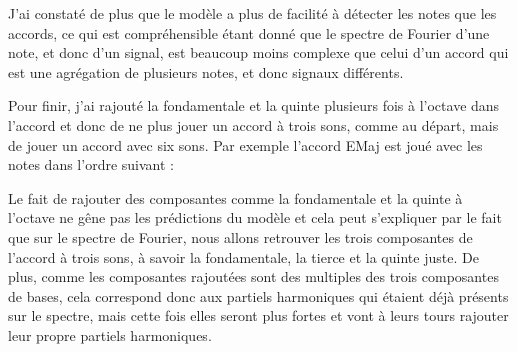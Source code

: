 J'ai constaté de plus que le modèle a plus de facilité à détecter les notes que les accords, ce qui est compréhensible étant donné que le spectre de Fourier d'une note, et donc d'un signal, est beaucoup moins complexe que celui d'un accord qui est une agrégation de plusieurs notes, et donc signaux différents.

Pour finir, j'ai rajouté la fondamentale et la quinte plusieurs fois à l'octave dans l'accord et donc de ne plus jouer un accord à trois sons, comme au départ, mais de jouer un accord avec six sons. Par exemple l'accord EMaj est joué avec les notes dans l'ordre suivant :

\begin{table}[H]
\end{table}

Le fait de rajouter des composantes comme la fondamentale et la quinte à l'octave ne gêne pas les prédictions du modèle et cela peut s'expliquer par le fait que sur le spectre de Fourier, nous allons retrouver les trois composantes de l'accord à trois sons, à savoir la fondamentale, la tierce et la quinte juste. De plus, comme les composantes rajoutées sont des multiples des trois composantes de bases, cela correspond donc aux partiels harmoniques qui étaient déjà présents sur le spectre, mais cette fois elles seront plus fortes et vont à leurs tours rajouter leur propre partiels harmoniques.
